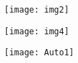\documentclass{article}
\begin{document}
\texttt{[image: img2]}

\texttt{[image: img4]}

\texttt{[image: Auto1]}

\end{document}
